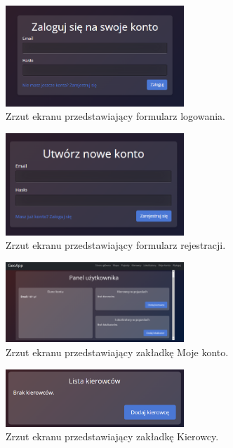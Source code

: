 \begin{figure}
	\centering
	\includegraphics[width=0.6\textwidth]{./graf/login_form.png}
	\caption{Zrzut ekranu przedstawiający formularz logowania.}
	\label{fig:4.2}
\end{figure}

\begin{figure}
	\centering
	\includegraphics[width=0.6\textwidth]{./graf/register_form.png}
	\caption{Zrzut ekranu przedstawiający formularz rejestracji.}
	\label{fig:4.3}
\end{figure}

\begin{figure}
	\centering
	\includegraphics[width=0.6\textwidth]{./graf/user_tab.png}
	\caption{Zrzut ekranu przedstawiający zakładkę Moje konto.}
	\label{fig:4.4}
\end{figure}

\begin{figure}
	\centering
	\includegraphics[width=0.6\textwidth]{./graf/driver_tab.png}
	\caption{Zrzut ekranu przedstawiający zakładkę Kierowcy.}
	\label{fig:4.5}
\end{figure}

